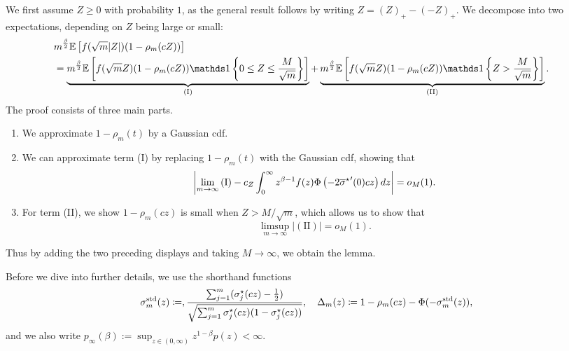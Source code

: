 We first assume $Z \geq 0$ with probability $1$, as the general result
follows by writing $Z = (Z)_+ - (-Z)_+$.  We decompose into two
expectations, depending on $Z$ being large or small:
\begin{align}
  \lefteqn{m^{\frac{\beta}{2}} \Ep \left[f(\sqrt m |Z|) (1 - \rho_m(cZ)) \right]}
  \nonumber \\
  & = \underbrace{m^{\frac{\beta}{2}} \Ep \left[f(\sqrt m Z) (1 - \rho_m(cZ)) \ind\left\{0 \leq Z \leq \frac{M}{\sqrt m}\right\} \right]}_{\mathrm{(I)}} + \underbrace{m^{\frac{\beta}{2}} \Ep \left[f(\sqrt m Z) (1 - \rho_m(cZ)) \ind\left\{Z > \frac{M}{\sqrt m}\right\} \right]}_{\mathrm{(II)}}   .  \label{eq:normal-mid-main}
\end{align}
The proof consists of three main parts. 
\begin{enumerate}[leftmargin=2em,label=\arabic*.]
\item We approximate $1-\rho_m(t)$ by a Gaussian cdf.
\item We can approximate term (I) by replacing $1-\rho_m(t)$ with
  the Gaussian cdf, showing that
  \begin{align}
    \left|\lim_{m \to \infty} \mathrm{(I)} - c_Z \int_0^\infty z^{\beta - 1} f(z) \Phi \left( - 2{\overline{\sigma}^\star}'(0) cz \right) dz \right| = o_M(1)   . \label{eq:normal-mid-3}
  \end{align} 
\item For term (II), we show $1- \rho_m(cz)$ is small when $Z > M/\sqrt{m}$, which allows us to show that
  \begin{equation*}
    \limsup_{m \to \infty}
    \left|\mathrm{(II)} \right| = o_M(1).
  \end{equation*}
\end{enumerate} 
Thus by adding the two preceding displays and taking $M \to \infty$, we
obtain the lemma.

\newcommand{\linkstd}{\sigma_m^{\textup{std}}}

Before we dive into further details, we use the shorthand functions
\begin{equation}
  \linkstd(z)
  \defeq, \frac{\sum_{j=1}^m \prns{\sigma_j\opt(cz) - \half}}{\sqrt{\sum_{j=1}^m \sigma_j\opt(cz)\prns{1 - \sigma_j\opt(cz)}}},
  ~~~
  \Delta_m(z) \defeq 1 - \rho_m(cz) - \Phi(- \linkstd(z))
  \label{eqn:std-link},
\end{equation}
and we also write $p_\infty(\beta) := \sup_{z \in (0, \infty)} z^{1-\beta}
p(z) < \infty$.

